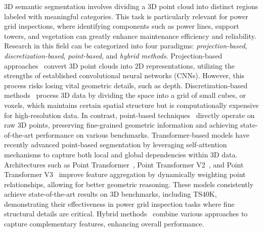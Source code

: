 3D semantic segmentation involves dividing a 3D point cloud into distinct regions labeled with meaningful categories. This task is particularly relevant for power grid inspections, where identifying components such as power lines, support towers, and vegetation can greatly enhance maintenance efficiency and reliability. Research in this field can be categorized into four paradigms: \textit{projection-based}, \textit{discretization-based}, \textit{point-based}, and \textit{hybrid methods}.
%
Projection-based approaches~\cite{su2015multi,lawin2017deep,yang2019learning,lyu2020learning} convert 3D point clouds into 2D representations, utilizing the strengths of established convolutional neural networks (CNNs). However, this process risks losing vital geometric details, such as depth.
%
Discretization-based methods~\cite{choy20194d,zhou2018voxelnet,le2018pointgrid,meng2019vv,zhang2020polarnet} process 3D data by dividing the space into a grid of small cubes, or voxels, which maintains certain spatial structure but is computationally expensive for high-resolution data.
%
In contrast, point-based techniques~\cite{qi2017pointnet,qi2017pointnet++,li2018pointcnn,thomas2019kpconv,hu2020randla,kong2023rethinking,lai2023spherical,zhao2021point,wu2022point,wu2023ptv3,pointcept2023} directly operate on raw 3D points, preserving fine-grained geometric information and achieving state-of-the-art performance on various benchmarks.
%
Transformer-based models have recently advanced point-based segmentation by leveraging self-attention mechanisms to capture both local and global dependencies within 3D data. Architectures such as Point Transformer~\cite{zhao2021point}, Point Transformer V2~\cite{wu2022point}, and Point Transformer V3~\cite{wu2023ptv3} improve feature aggregation by dynamically weighting point relationships, allowing for better geometric reasoning. These models consistently achieve state-of-the-art results on 3D benchmarks, including TS40K, demonstrating their effectiveness in power grid inspection tasks where fine structural details are critical.
%
Hybrid methods~\cite{dai20183dmv,jaritz2019multi,tang2020searching,hou2022point,liu2023uniseg} combine various approaches to capture complementary features, enhancing overall performance.


